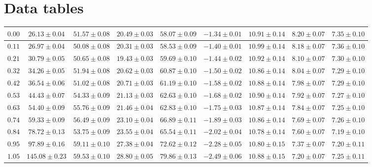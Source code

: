 \chapter*{Data tables}

\begin{sidewaystable}[t!]
    \centering
    \begin{tabular}{|c|c|c|c|c|c|c|c|c|}
    \hline
    $0.00$ & $26.13 \pm 0.04$ & $51.57 \pm 0.08$ & $20.49 \pm 0.03$ & $58.07 \pm 0.09$ & $-1.34 \pm 0.01$ & $10.91 \pm 0.14$ & $8.20 \pm 0.07$ & $7.35 \pm 0.10$ \\
    \hline
    $0.11$ & $26.97 \pm 0.04$ & $50.08 \pm 0.08$ & $20.31 \pm 0.03$ & $58.53 \pm 0.09$ & $-1.40 \pm 0.01$ & $10.99 \pm 0.14$ & $8.18 \pm 0.07$ & $7.36 \pm 0.10$ \\
    \hline
    $0.21$ & $30.79 \pm 0.05$ & $50.65 \pm 0.08$ & $19.43 \pm 0.03$ & $59.69 \pm 0.10$ & $-1.44 \pm 0.02$ & $10.92 \pm 0.14$ & $8.10 \pm 0.07$ & $7.30 \pm 0.10$ \\
    \hline
    $0.32$ & $34.26 \pm 0.05$ & $51.94 \pm 0.08$ & $20.62 \pm 0.03$ & $60.87 \pm 0.10$ & $-1.50 \pm 0.02$ & $10.86 \pm 0.14$ & $8.04 \pm 0.07$ & $7.29 \pm 0.10$ \\
    \hline
    $0.42$ & $36.54 \pm 0.06$ & $51.02 \pm 0.08$ & $20.71 \pm 0.03$ & $61.19 \pm 0.10$ & $-1.58 \pm 0.02$ & $10.88 \pm 0.14$ & $7.98 \pm 0.07$ & $7.29 \pm 0.10$ \\
    \hline
    $0.53$ & $44.43 \pm 0.07$ & $54.33 \pm 0.09$ & $21.13 \pm 0.03$ & $62.63 \pm 0.10$ & $-1.68 \pm 0.02$ & $10.90 \pm 0.14$ & $7.92 \pm 0.07$ & $7.27 \pm 0.10$ \\
    \hline
    $0.63$ & $54.40 \pm 0.09$ & $55.76 \pm 0.09$ & $21.46 \pm 0.04$ & $62.83 \pm 0.10$ & $-1.75 \pm 0.03$ & $10.87 \pm 0.14$ & $7.84 \pm 0.07$ & $7.25 \pm 0.10$ \\
    \hline
    $0.74$ & $59.33 \pm 0.09$ & $56.49 \pm 0.09$ & $23.10 \pm 0.04$ & $66.89 \pm 0.11$ & $-1.89 \pm 0.03$ & $10.86 \pm 0.14$ & $7.69 \pm 0.07$ & $7.26 \pm 0.10$ \\
    \hline
    $0.84$ & $78.72 \pm 0.13$ & $53.75 \pm 0.09$ & $23.55 \pm 0.04$ & $65.54 \pm 0.11$ & $-2.02 \pm 0.04$ & $10.78 \pm 0.14$ & $7.60 \pm 0.07$ & $7.19 \pm 0.10$ \\
    \hline
    $0.95$ & $97.89 \pm 0.16$ & $59.11 \pm 0.10$ & $27.38 \pm 0.04$ & $72.62 \pm 0.12$ & $-2.28 \pm 0.05$ & $10.80 \pm 0.15$ & $7.37 \pm 0.07$ & $7.20 \pm 0.11$ \\
    \hline
    $1.05$ & $145.08 \pm 0.23$ & $59.53 \pm 0.10$ & $28.80 \pm 0.05$ & $79.86 \pm 0.13$ & $-2.49 \pm 0.06$ & $10.88 \pm 0.15$ & $7.20 \pm 0.07$ & $7.25 \pm 0.11$ \\

\end{tabular}
\end{sidewaystable}
